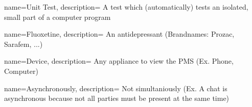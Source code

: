 {  
    name={Unit Test},
    description={
        A test which (automatically) tests an isolated, small part of a computer program
    }
}

{  
    name={Fluoxetine},
    description={
        An antidepressant (Brandnames: Prozac, Sarafem, ...)
    }
}

{  
    name={Device},
    description={
      Any appliance to view the PMS (Ex. Phone, Computer)
    }
}

{  
    name={Asynchronously},
    description={
      Not simultaniously (Ex. A chat is asynchronous because not all parties must be present at the same time)
    }
}
